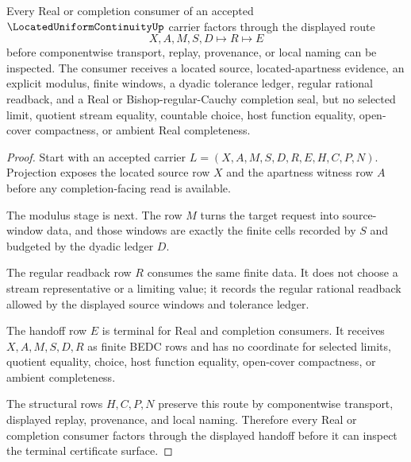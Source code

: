 \begin{theorem}
\label{thm:located-uniform-continuity-completion-handoff}
Every Real or completion consumer of an accepted $\LocatedUniformContinuityUp$ carrier factors through the displayed route
$$
X,A,M,S,D \longmapsto R \longmapsto E
$$
before componentwise transport, replay, provenance, or local naming can be inspected. The consumer receives a located source, located-apartness evidence, an explicit modulus, finite windows, a dyadic tolerance ledger, regular rational readback, and a Real or Bishop-regular-Cauchy completion seal, but no selected limit, quotient stream equality, countable choice, host function equality, open-cover compactness, or ambient Real completeness.
\end{theorem}
\begin{proof}
Start with an accepted carrier $L=(X,A,M,S,D,R,E,H,C,P,N)$. Projection exposes the located source row $X$ and the apartness witness row $A$ before any completion-facing read is available.

The modulus stage is next. The row $M$ turns the target request into source-window data, and those windows are exactly the finite cells recorded by $S$ and budgeted by the dyadic ledger $D$.

The regular readback row $R$ consumes the same finite data. It does not choose a stream representative or a limiting value; it records the regular rational readback allowed by the displayed source windows and tolerance ledger.

The handoff row $E$ is terminal for Real and completion consumers. It receives $X,A,M,S,D,R$ as finite BEDC rows and has no coordinate for selected limits, quotient equality, choice, host function equality, open-cover compactness, or ambient completeness.

The structural rows $H,C,P,N$ preserve this route by componentwise transport, displayed replay, provenance, and local naming. Therefore every Real or completion consumer factors through the displayed handoff before it can inspect the terminal certificate surface.
\end{proof}

